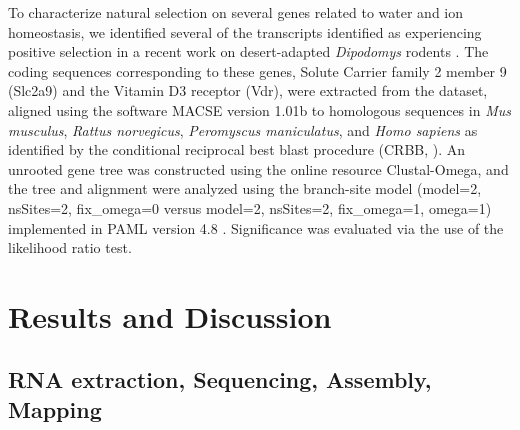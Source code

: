 \documentclass[11pt]{article}
\begin{document}
To characterize natural selection on several genes related to water and ion homeostasis, we identified several of the transcripts identified as experiencing positive selection in a recent work on desert-adapted \textit{Dipodomys} rodents \cite{Marra:2014de}. The coding sequences corresponding to these genes, Solute Carrier family 2 member 9  (Slc2a9) and the Vitamin D3 receptor (Vdr), were extracted from the dataset, aligned using the software MACSE version 1.01b\cite{Ranwez:2011kj} to homologous sequences in \textit{Mus musculus}, \textit{Rattus norvegicus}, \textit{Peromyscus maniculatus}, and \textit{Homo sapiens} as identified by the conditional reciprocal best blast procedure (CRBB, \cite{Aubry:2014en}). An unrooted gene tree was constructed using the online resource Clustal-Omega, and the tree and alignment were analyzed using the branch-site model (model=2, nsSites=2, fix\_omega=0 versus model=2, nsSites=2, fix\_omega=1, omega=1)  implemented in PAML version 4.8 \cite{Yang:2011bm,Yang:2007ki}. Significance was evaluated via the use of the likelihood ratio test. \\   


\section*{Results and Discussion}

\subsection*{RNA extraction, Sequencing, Assembly, Mapping}
\end{document}
